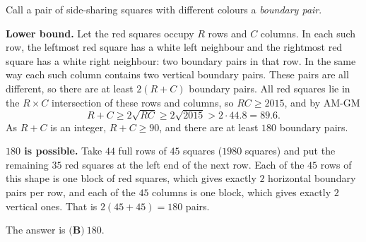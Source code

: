 Call a pair of side-sharing squares with different colours a \emph{boundary pair}.

\textbf{Lower bound.} Let the red squares occupy $R$ rows and $C$ columns. In each such row, the leftmost red square has a white left neighbour and the rightmost red square has a white right neighbour: two boundary pairs in that row. In the same way each such column contains two vertical boundary pairs. These pairs are all different, so there are at least $2(R+C)$ boundary pairs. All red squares lie in the $R\times C$ intersection of these rows and columns, so $RC\ge2015$, and by AM-GM
\[
R+C\ge2\sqrt{RC}\ge2\sqrt{2015}>2\cdot44.8=89.6 .
\]
As $R+C$ is an integer, $R+C\ge90$, and there are at least $180$ boundary pairs.

\textbf{$180$ is possible.} Take $44$ full rows of $45$ squares ($1980$ squares) and put the remaining $35$ red squares at the left end of the next row. Each of the $45$ rows of this shape is one block of red squares, which gives exactly $2$ horizontal boundary pairs per row, and each of the $45$ columns is one block, which gives exactly $2$ vertical ones. That is $2(45+45)=180$ pairs.

The answer is $\boxed{\textbf{(B)}\ 180}$.
